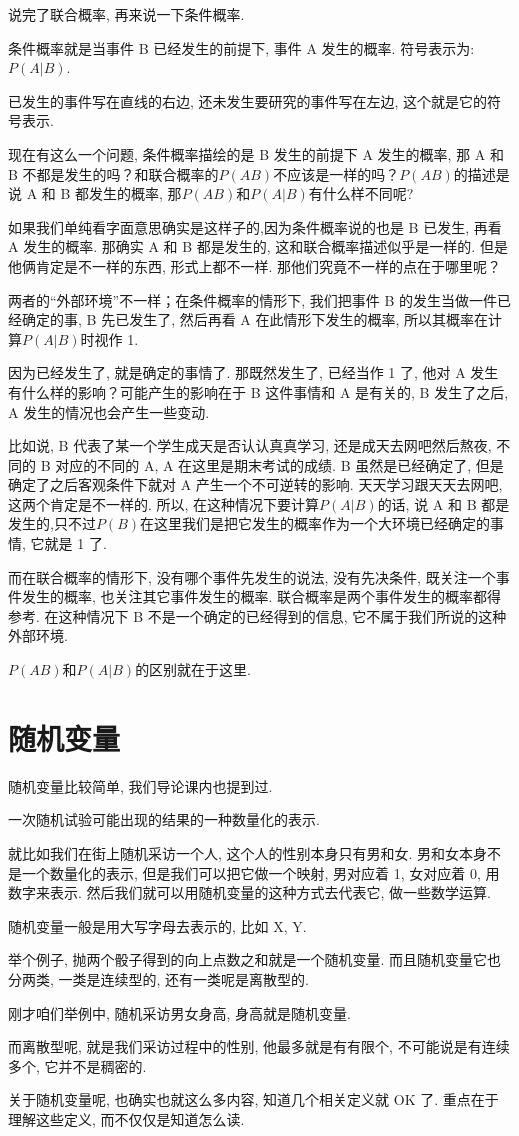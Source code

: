 说完了联合概率, 再来说一下条件概率. 

条件概率就是当事件 B 已经发生的前提下, 事件 A 发生的概率. 符号表示为: $P(A|B)$. 

已发生的事件写在直线的右边, 还未发生要研究的事件写在左边, 这个就是它的符号表示. 

现在有这么一个问题, 条件概率描绘的是 B 发生的前提下 A 发生的概率, 那 A 和 B 不都是发生的吗？和联合概率的$P(AB)$不应该是一样的吗？$P(AB)$的描述是说 A 和 B 都发生的概率, 那$P(AB)$和$P(A|B)$有什么样不同呢?

如果我们单纯看字面意思确实是这样子的,因为条件概率说的也是 B 已发生, 再看 A 发生的概率. 那确实 A 和 B 都是发生的, 这和联合概率描述似乎是一样的. 但是他俩肯定是不一样的东西, 形式上都不一样. 那他们究竟不一样的点在于哪里呢？

两者的“外部环境”不一样；在条件概率的情形下, 我们把事件 B 的发生当做一件已经确定的事, B 先已发生了, 然后再看 A 在此情形下发生的概率, 所以其概率在计算$P(A|B)$时视作 1. 

因为已经发生了, 就是确定的事情了. 那既然发生了, 已经当作 1 了, 他对 A 发生有什么样的影响？可能产生的影响在于 B 这件事情和 A 是有关的, B 发生了之后, A 发生的情况也会产生一些变动. 

比如说, B 代表了某一个学生成天是否认认真真学习, 还是成天去网吧然后熬夜, 不同的 B 对应的不同的 A, A 在这里是期末考试的成绩. B 虽然是已经确定了, 但是确定了之后客观条件下就对 A 产生一个不可逆转的影响. 天天学习跟天天去网吧, 这两个肯定是不一样的. 所以, 在这种情况下要计算$P(A|B)$的话, 说 A 和 B 都是发生的,只不过$P(B)$在这里我们是把它发生的概率作为一个大环境已经确定的事情, 它就是 1 了. 

而在联合概率的情形下, 没有哪个事件先发生的说法, 没有先决条件, 既关注一个事件发生的概率, 也关注其它事件发生的概率. 联合概率是两个事件发生的概率都得参考. 在这种情况下 B 不是一个确定的已经得到的信息, 它不属于我们所说的这种外部环境. 

$P(AB)$和$P(A|B)$的区别就在于这里. 

\section{随机变量}

随机变量比较简单, 我们导论课内也提到过. 

一次随机试验可能出现的结果的一种数量化的表示. 

就比如我们在街上随机采访一个人, 这个人的性别本身只有男和女. 男和女本身不是一个数量化的表示, 但是我们可以把它做一个映射, 男对应着 1, 女对应着 0, 用数字来表示. 然后我们就可以用随机变量的这种方式去代表它, 做一些数学运算. 

随机变量一般是用大写字母去表示的, 比如 X, Y. 

举个例子, 抛两个骰子得到的向上点数之和就是一个随机变量. 而且随机变量它也分两类, 一类是连续型的, 还有一类呢是离散型的. 

刚才咱们举例中, 随机采访男女身高, 身高就是随机变量. 

而离散型呢, 就是我们采访过程中的性别, 他最多就是有有限个, 不可能说是有连续多个, 它并不是稠密的. 

关于随机变量呢, 也确实也就这么多内容, 知道几个相关定义就 OK 了. 重点在于理解这些定义, 而不仅仅是知道怎么读. 
